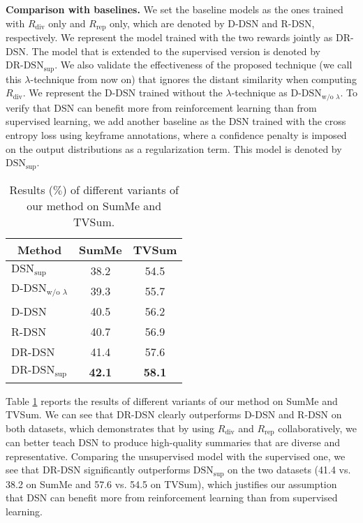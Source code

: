 \documentclass[letterpaper]{article} \usepackage{aaai18}  \usepackage{times}  \usepackage{helvet}  \usepackage{courier}  \usepackage{url}  \usepackage{graphicx}
\begin{document}
{\bf Comparison with baselines.} We set the baseline models as the ones trained with $R_\text{div}$ only and $R_\text{rep}$ only, which are denoted by D-DSN and R-DSN, respectively. We represent the model trained with the two rewards jointly as DR-DSN. The model that is extended to the supervised version is denoted by $\text{DR-DSN}_\text{sup}$. We also validate the effectiveness of the proposed technique (we call this $\lambda$-technique from now on) that ignores the distant similarity when computing $R_\text{div}$. We represent the D-DSN trained without the $\lambda$-technique as $\text{D-DSN}_{\text{w/o $\lambda$}}$. To verify that DSN can benefit more from reinforcement learning than from supervised learning, we add another baseline as the DSN trained with the cross entropy loss using keyframe annotations, where a confidence penalty \cite{pereyra2017regularizing} is imposed on the output distributions as a regularization term. This model is denoted by $\text{DSN}_{\text{sup}}$.

\begin{table}[h]
\centering
\caption{Results ($\%$) of different variants of our method on SumMe and TVSum.}
\label{tb:comparebaselines}
\begin{tabular}{l | c | c}
\hline
\multicolumn{1}{c|}{Method} & SumMe & TVSum \\
\hline
$\text{DSN}_\text{sup}$ & 38.2 & 54.5 \\
$\text{D-DSN}_{\text{w/o $\lambda$}}$ & 39.3 & 55.7 \\
D-DSN & 40.5 & 56.2 \\
R-DSN & 40.7 & 56.9 \\
\hline \hline
DR-DSN & 41.4 & 57.6 \\
$\text{DR-DSN}_\text{sup}$ & {\bf 42.1} & {\bf 58.1} \\
\hline
\end{tabular}
\end{table}

Table \ref{tb:comparebaselines} reports the results of different variants of our method on SumMe and TVSum. We can see that DR-DSN clearly outperforms D-DSN and R-DSN on both datasets, which demonstrates that by using $R_\text{div}$ and $R_\text{rep}$ collaboratively, we can better teach DSN to produce high-quality summaries that are diverse and representative. Comparing the unsupervised model with the supervised one, we see that DR-DSN significantly outperforms $\text{DSN}_{\text{sup}}$ on the two datasets (41.4 vs. 38.2 on SumMe and 57.6 vs. 54.5 on TVSum), which justifies our assumption that DSN can benefit more from reinforcement learning than from supervised learning.
\end{document}
